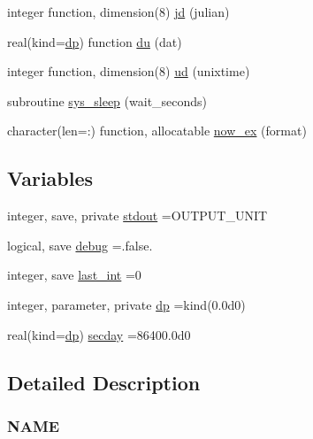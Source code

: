 \begin{DoxyCompactItemize}
\item 
integer function, dimension(8) \mbox{\hyperlink{namespacem__journal_a1e8e57f466830af519edad2004176fbc}{jd}} (julian)
\item 
real(kind=\mbox{\hyperlink{namespacem__journal_aaae0522a70bb76a85ea800670d5fec5f}{dp}}) function \mbox{\hyperlink{namespacem__journal_a1736ec58cd905293782a2663df69bc89}{du}} (dat)
\item 
integer function, dimension(8) \mbox{\hyperlink{namespacem__journal_abfa78dcc463f8fcdffe0b259df2f4c92}{ud}} (unixtime)
\item 
subroutine \mbox{\hyperlink{namespacem__journal_aaa9769d86a12f3f850e425991c8bcff7}{sys\+\_\+sleep}} (wait\+\_\+seconds)
\item 
character(len=\+:) function, allocatable \mbox{\hyperlink{namespacem__journal_a9c8074667748f2685122f2b3147e61d5}{now\+\_\+ex}} (format)
\end{DoxyCompactItemize}
\subsection*{Variables}
\begin{DoxyCompactItemize}
\item 
integer, save, private \mbox{\hyperlink{namespacem__journal_a664cf3fd85385b776d30ea589606ad1c}{stdout}} =O\+U\+T\+P\+U\+T\+\_\+\+U\+N\+IT
\item 
logical, save \mbox{\hyperlink{namespacem__journal_a6184fbcebdfa06f0a45ce4c699189b53}{debug}} =.false.
\item 
integer, save \mbox{\hyperlink{namespacem__journal_a47e8e34dc4072b04101027394d688519}{last\+\_\+int}} =0
\item 
integer, parameter, private \mbox{\hyperlink{namespacem__journal_aaae0522a70bb76a85ea800670d5fec5f}{dp}} =kind(0.\+0d0)
\item 
real(kind=\mbox{\hyperlink{namespacem__journal_aaae0522a70bb76a85ea800670d5fec5f}{dp}}) \mbox{\hyperlink{namespacem__journal_aa6eaee3a08e2f478f696f278bad54df8}{secday}} =86400.\+0d0
\end{DoxyCompactItemize}


\subsection{Detailed Description}
\subsubsection*{N\+A\+ME}

